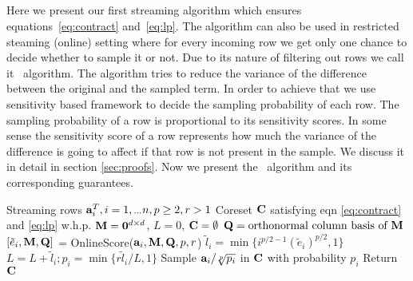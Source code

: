 \subsection{\online}
Here we present our first streaming algorithm which ensures equations~\eqref{eq:contract} and~\eqref{eq:lp}. The algorithm can also be used in restricted steaming (online) setting where for every incoming row we get only one chance to decide whether to sample it or not. Due to its nature of filtering out rows we call it \online~algorithm. The algorithm tries to reduce the variance of the difference between the original and the sampled term. In order to achieve that we use sensitivity based framework to decide the sampling probability of each row. The sampling probability of a row is proportional to its sensitivity scores. In some sense the sensitivity score of a row represents how much the variance of the difference is going to affect if that row is not present in the sample. We discuss it in detail in section \ref{sec:proofs}.
Now we present the \online~algorithm and its corresponding guarantees. 
\begin{algorithm}[htpb]
\caption{\online~}{\label{alg:onlineCoreset}}
\begin{algorithmic}
\REQUIRE Streaming rows $\mathbf{a}_{i}^T, i = 1, {}_{\cdots} n, p \geq 2, r > 1$
\ENSURE Coreset $\mathbf{C}$ satisfying eqn \eqref{eq:contract} and \eqref{eq:lp} w.h.p.
\STATE $\mathbf{M} = \mathbf{0}^{d \times d}$, $L=0$, $\mathbf{C}= \emptyset$
\STATE $\mathbf{Q} =  \mbox{orthonormal column basis of }\mathbf{M}$
\STATE $[\tilde{e}_{i}, \mathbf{M}, \mathbf{Q}]$ = OnlineScore($\mathbf{a}_{i},\mathbf{M},\mathbf{Q},p,r$)
\STATE $\tilde{l}_{i} = \min\{i^{p/2-1}(\tilde{e}_{i})^{p/2},1\}$
\STATE $L = L+\tilde{l}_{i}; p_{i} = \min\{r\tilde{l}_{i}/L,1\}$
\STATE Sample $\mathbf{a}_{i}/\sqrt[p]{p_{i}}$ in $\mathbf{C}$ with probability $p_{i}$
\ENDWHILE
\STATE Return $\mathbf{C}$
\end{algorithmic}
\end{algorithm}

